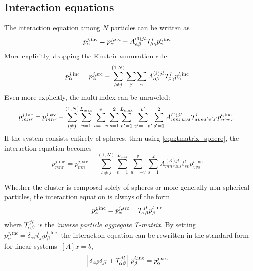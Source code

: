 \documentclass[11pt]{article}
\begin{document}
\subsection{Interaction equations}
The interaction equation among $N$ particles can be written as
\begin{equation}
    p_{\alpha}^{j,\text{inc}} = 
    p_{\alpha}^{j,\text{src}} -
    A_{\alpha \beta}^{(3)jl}
    \mathcal{T}_{\beta \gamma}^l
    p_{\gamma}^{l,\text{inc}}
\label{eqn:particle_interactions}
\end{equation}
More explicitly, dropping the Einstein summation rule:
\begin{equation}
    p_{\alpha}^{j,\text{inc}} = 
    p_{\alpha}^{j,\text{src}} -
    \sum_{l \neq j}^{(1,N)}
    \sum_{\beta} \sum_{\gamma}
    A_{\alpha \beta}^{(3)jl}
    \mathcal{T}_{\beta \gamma}^l
    p_{\gamma}^{l,\text{inc}}
\end{equation}
Even more explicitly, the multi-index can be unraveled:
\begin{equation}
    p_{mnr}^{j,\text{inc}} = 
    p_{mnr}^{j,\text{src}} -
    \sum_{l \neq j}^{(1,N)}\sum_{v=1}^{L_\text{max}} \sum_{u=-v}^{v}
    \sum_{s=1}^{2}
    \sum_{v^\prime=1}^{L_\text{max}} \sum_{u^\prime=-v^\prime}^{v^\prime}
    \sum_{s^\prime=1}^{2}
    A_{mnruvs}^{(3)jl}
    \mathcal{T}_{uvsu^\prime v^\prime s^\prime}^l
    p_{u^\prime v^\prime s^\prime}^{l,\text{inc}}
\end{equation}
If the system consists entirely of spheres, then using \cref{eqn:tmatrix_sphere}, the interaction equation becomes
\begin{equation}
    p_{mnr}^{j,\text{inc}} = p_{mn}^{j,\text{src}}  -  \sum_{l \neq j}^{(1,N)}\sum_{v=1}^{L_\text{max}} \sum_{u=-v}^{v} \sum_{s=1}^2
    A_{mnruvs}^{(3)jl} t_{sv}^l p_{uvs}^{l,\text{inc}}
    \label{eqn:sphere_interations}
\end{equation}

Whether the cluster is composed solely of spheres or more generally non-spherical particles, the interaction equation is always of the form
\begin{equation}
    p_{\alpha}^{j,\text{inc}} = 
    p_{\alpha}^{j,\text{src}} -
    \mathcal{T}_{\alpha \beta}^{jl}
    p_{\beta}^{l,\text{inc}}
\end{equation}
where $\mathcal{T}_{\alpha \beta}^{jl}$ is the \emph{inverse particle aggregate T-matrix}.
By setting $p_\alpha^{j,\text{inc}} = \delta_{\alpha\beta} \delta_{jl} p_\beta^{l,\text{inc}}$, the interaction equation can be rewritten in the standard form for linear systems, $[A]x=b$,
\begin{equation}
    \left[ \delta_{\alpha\beta} \delta_{jl}
    + \mathcal{T}_{\alpha \beta}^{jl} \right]
    p_{\beta}^{l,\text{inc}} =
    p_{\alpha}^{j,\text{src}}
\end{equation}
\end{document}
